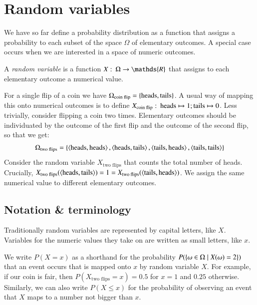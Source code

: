 \documentclass[nobib,nofonts]{tufte-handout}
\renewcommand{\markdef}[1]{\emph{#1}}
\begin{document}
\newpage

\section{Random variables}

We have so far define a probability distribution as a function that assigns a probability to
each subset of the space $\Omega$ of elementary outcomes. A special case occurs when we are
interested in a space of numeric outcomes.

A \markdef{random variable} is a function $X \mycolon \Omega \rightarrow \mathds{R}$ that
assigns to each elementary outcome a numerical value.

\begin{example}
  For a single flip of a coin we have $\Omega_{\text{coin flip}} =
  \left\{\text{heads}, \text{tails}\right\}$. A usual way of mapping this onto numerical outcomes is to
  define $X_{\text{coin flip}} \thinspace \colon \thinspace \text{heads} \mapsto 1; \text{tails} \mapsto 0$. Less trivially, consider
  flipping a coin two times. Elementary outcomes should be individuated by the outcome of the
  first flip and the outcome of the second flip, so that we get:
  \begin{align*}
    \Omega_{\text{two flips}} = \left\{\left \langle \text{heads}, \text{heads}\right\rangle, \left \langle \text{heads}, \text{tails}\right\rangle,
    \left \langle \text{tails}, \text{heads}\right\rangle, \left \langle \text{tails}, \text{tails}\right\rangle\right\}
  \end{align*}
  Consider the random variable $X_{\text{two flips}}$ that counts the
  total number of heads. Crucially,
  $X_{\text{two flips}}(\left \langle \text{heads}, \text{tails}\right\rangle) = 1 = X_{\text{two
      flips}}(\left \langle \text{tails}, \text{heads}\right\rangle)$. We assign the same numerical value to
  different elementary outcomes.
\end{example}


\subsection{Notation \& terminology}

Traditionally random variables are represented by capital letters, like $X$. Variables for the
numeric values they take on are written as small letters, like $x$.

We write $P(X = x)$ as a shorthand for the probability
$P(\left\{\omega \in \Omega \mid X(\omega) = 2\right\})$ that an event occurs that is mapped onto $x$ by
random variable $X$. For example, if our coin is fair, then $P(X_{\text{two flips}} = x) = 0.5$
for $x=1$ and $0.25$ otherwise. Similarly, we can also write $P(X \le x)$ for the probability
of observing an event that $X$ maps to a number not bigger than $x$.
\end{document}
